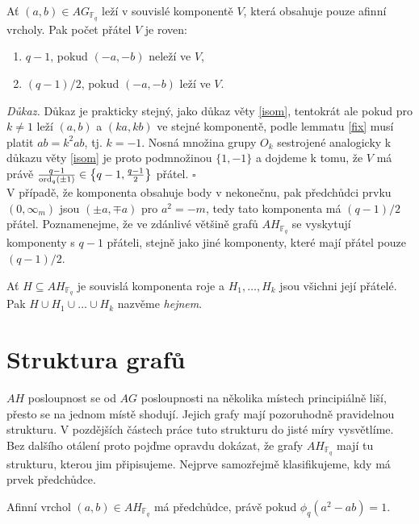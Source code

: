 \documentclass[12pt]{report}
\begin{document}
\begin{veta}
Ať $(a,b) \in AG_{\mathbb{F}_q}$ leží v souvislé komponentě $V$, která obsahuje pouze afinní vrcholy. Pak počet přátel $V$ je roven:
\begin{enumerate}
\item $q-1$, pokud $(-a,-b)$ neleží ve $V$,
\item $(q-1)/2$, pokud $(-a,-b)$ leží ve $V$.
\end{enumerate} 
\end{veta}
\noindent \textit{Důkaz.} Důkaz je prakticky stejný, jako důkaz věty \ref{isom}, tentokrát ale pokud pro $k \neq 1$ leží $(a,b)$ a $(ka,kb)$ ve stejné komponentě, podle lemmatu \ref{fix} musí platit $a b = k^2 ab$, tj. $k = - 1$. Nosná množina grupy $O_{k}$ sestrojené analogicky k důkazu věty \ref{isom} je proto podmnožinou $\lbrace 1,-1 \rbrace$ a dojdeme k tomu, že  $V$ má právě $\frac{q-1}{\operatorname{ord}_q (\pm 1)} \in  \left\lbrace q-1,\frac{q-1}{2}\right\rbrace$ přátel. \hfill $\square$\\

V případě, že komponenta obsahuje body v nekonečnu, pak předchůdci prvku $(0,\infty_m)$ jsou $(\pm a,\mp a)$ pro $a^2 = -m$, tedy tato komponenta má $(q-1)/2$ přátel. Poznamenejme, že ve zdánlivé většině grafů $AH_{\mathbb{F}_q}$ se vyskytují komponenty s $q-1$ přáteli, stejně jako jiné komponenty, které mají přátel pouze $(q-1)/2$.

\begin{definice}
Ať $H \subseteq AH_{\mathbb{F}_q}$ je souvislá komponenta roje a $H_1,\dots,H_k$ jsou všichni její přátelé. Pak $H \cup H_1 \cup \dots \cup H_k$ nazvěme \textit{hejnem}.
\end{definice}
 

\section{Struktura grafů}

$AH$ posloupnost se od $AG$ posloupnosti na několika místech principiálně liší, přesto se na jednom místě shodují. Jejich grafy mají pozoruhodně pravidelnou strukturu. V pozdějších částech práce tuto strukturu do jisté míry vysvětlíme. Bez dalšího otálení proto pojďme opravdu dokázat, že grafy $AH_{\mathbb{F}_q}$ mají tu strukturu, kterou jim připisujeme. Nejprve samozřejmě klasifikujeme, kdy má prvek předchůdce.

\begin{lemma}
Afinní vrchol $(a,b) \in AH_{\mathbb{F}_q}$ má předchůdce, právě pokud $\phi_q(a^2-ab)=1$.
\end{lemma}
\end{document}
